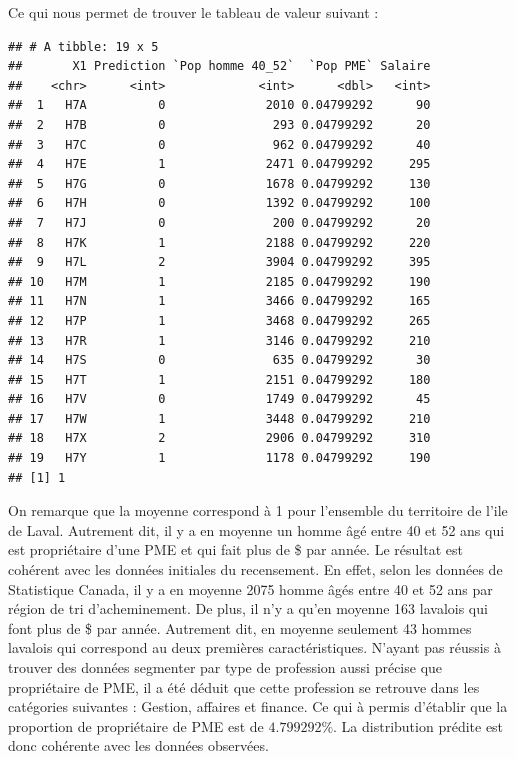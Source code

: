 \documentclass[11pt,french]{report}\usepackage[]{graphicx}\usepackage[]{color}
\makeatletter
\newenvironment{kframe}{%
 \def\at@end@of@kframe{}%
 \ifinner\ifhmode%
  \def\at@end@of@kframe{\end{minipage}}%
  \begin{minipage}{\columnwidth}%
 \fi\fi%
 \def\FrameCommand##1{\hskip\@totalleftmargin \hskip-\fboxsep
 \colorbox{shadecolor}{##1}\hskip-\fboxsep
     \hskip-\linewidth \hskip-\@totalleftmargin \hskip\columnwidth}%
 \MakeFramed {\advance\hsize-\width
   \@totalleftmargin\z@ \linewidth\hsize
   \@setminipage}}%
 {\par\unskip\endMakeFramed%
 \at@end@of@kframe}
\newenvironment{knitrout}{}{} %
\makeatother
\begin{document}
Ce qui nous permet de trouver le tableau de valeur suivant :
\begin{knitrout}
\color{fgcolor}\begin{kframe}
\begin{verbatim}
## # A tibble: 19 x 5
##       X1 Prediction `Pop homme 40_52`  `Pop PME` Salaire
##    <chr>      <int>             <int>      <dbl>   <int>
##  1   H7A          0              2010 0.04799292      90
##  2   H7B          0               293 0.04799292      20
##  3   H7C          0               962 0.04799292      40
##  4   H7E          1              2471 0.04799292     295
##  5   H7G          0              1678 0.04799292     130
##  6   H7H          0              1392 0.04799292     100
##  7   H7J          0               200 0.04799292      20
##  8   H7K          1              2188 0.04799292     220
##  9   H7L          2              3904 0.04799292     395
## 10   H7M          1              2185 0.04799292     190
## 11   H7N          1              3466 0.04799292     165
## 12   H7P          1              3468 0.04799292     265
## 13   H7R          1              3146 0.04799292     210
## 14   H7S          0               635 0.04799292      30
## 15   H7T          1              2151 0.04799292     180
## 16   H7V          0              1749 0.04799292      45
## 17   H7W          1              3448 0.04799292     210
## 18   H7X          2              2906 0.04799292     310
## 19   H7Y          1              1178 0.04799292     190
## [1] 1
\end{verbatim}
\end{kframe}
\end{knitrout}
On remarque que la moyenne correspond à 1 pour l'ensemble du territoire de l'ile de Laval. Autrement dit, il y a en moyenne un homme âgé entre 40 et 52 ans qui est propriétaire d'une PME et qui fait plus de  \$ par année. Le résultat est cohérent avec les données initiales du recensement. En effet, selon les données de Statistique Canada, il y a en moyenne 2075 homme âgés entre 40 et 52 ans par région de tri d'acheminement. De plus, il n'y a qu'en moyenne 163 lavalois qui font plus de  \$ par année. Autrement dit, en moyenne seulement 43 hommes lavalois qui correspond au deux premières caractéristiques. N'ayant pas réussis à trouver des données segmenter par type de profession aussi précise que propriétaire de PME, il a été déduit que cette profession se retrouve dans les catégories suivantes : Gestion,  affaires et finance. Ce qui à permis d'établir que la proportion de propriétaire de PME est de $4.799292 \%$. La distribution prédite est donc cohérente avec les données observées.
\end{document}
